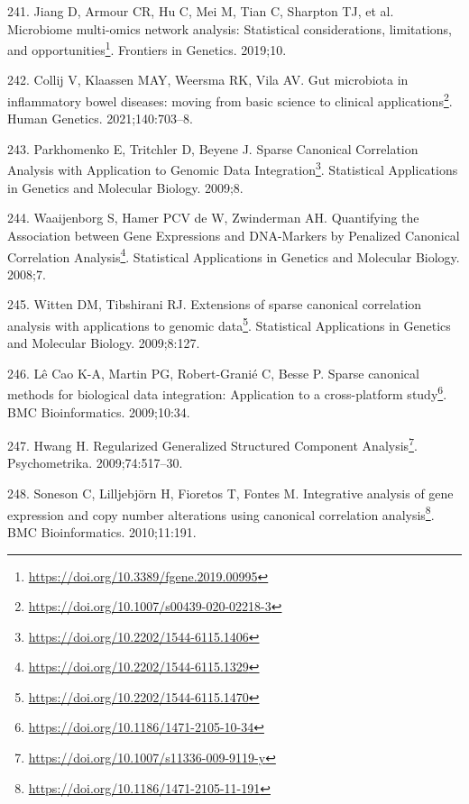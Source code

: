 \documentclass[
  a4paper,
]{book}
\DeclareRobustCommand{\href}[2]{#2\footnote{\url{#1}}}
\newlength{\cslhangindent}
\newlength{\cslentryspacingunit} %
\newenvironment{CSLReferences}[2] %
 {%
  \setlength{\parindent}{0pt}
  \ifodd #1
  \let\oldpar\par
  \def\par{\hangindent=\cslhangindent\oldpar}
  \fi
  \setlength{\parskip}{#2\cslentryspacingunit}
 }%
 {}
\begin{document}
\begin{CSLReferences}{0}{0}
\leavevmode{}%
241. Jiang D, Armour CR, Hu C, Mei M, Tian C, Sharpton TJ, et al. \href{https://doi.org/10.3389/fgene.2019.00995}{Microbiome multi-omics network analysis: Statistical considerations, limitations, and opportunities}. Frontiers in Genetics. 2019;10.

\leavevmode{}%
242. Collij V, Klaassen MAY, Weersma RK, Vila AV. \href{https://doi.org/10.1007/s00439-020-02218-3}{Gut microbiota in inflammatory bowel diseases: moving from basic science to clinical applications}. Human Genetics. 2021;140:703--8.

\leavevmode{}%
243. Parkhomenko E, Tritchler D, Beyene J. \href{https://doi.org/10.2202/1544-6115.1406}{Sparse Canonical Correlation Analysis with Application to Genomic Data Integration}. Statistical Applications in Genetics and Molecular Biology. 2009;8.

\leavevmode{}%
244. Waaijenborg S, Hamer PCV de W, Zwinderman AH. \href{https://doi.org/10.2202/1544-6115.1329}{Quantifying the Association between Gene Expressions and DNA-Markers by Penalized Canonical Correlation Analysis}. Statistical Applications in Genetics and Molecular Biology. 2008;7.

\leavevmode{}%
245. Witten DM, Tibshirani RJ. \href{https://doi.org/10.2202/1544-6115.1470}{Extensions of sparse canonical correlation analysis with applications to genomic data}. Statistical Applications in Genetics and Molecular Biology. 2009;8:127.

\leavevmode{}%
246. Lê Cao K-A, Martin PG, Robert-Granié C, Besse P. \href{https://doi.org/10.1186/1471-2105-10-34}{Sparse canonical methods for biological data integration: Application to a cross-platform study}. BMC Bioinformatics. 2009;10:34.

\leavevmode{}%
247. Hwang H. \href{https://doi.org/10.1007/s11336-009-9119-y}{Regularized Generalized Structured Component Analysis}. Psychometrika. 2009;74:517--30.

\leavevmode{}%
248. Soneson C, Lilljebjörn H, Fioretos T, Fontes M. \href{https://doi.org/10.1186/1471-2105-11-191}{Integrative analysis of gene expression and copy number alterations using canonical correlation analysis}. BMC Bioinformatics. 2010;11:191.


\end{CSLReferences}
\end{document}
